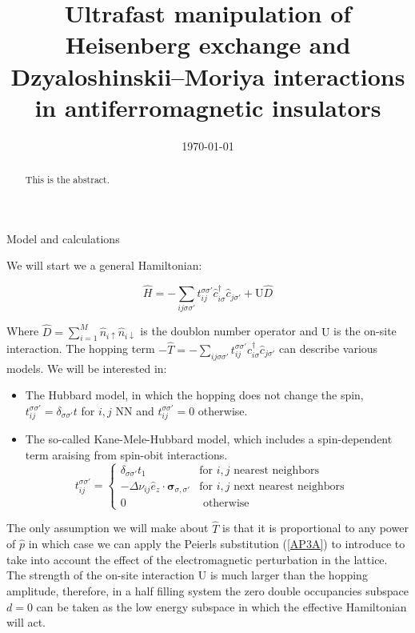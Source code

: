 \documentclass[aps,prl,twocolumn,amsmath,amssymb,superscriptaddress]{revtex4}%
\newcommand{\n}{\nonumber}
\newcommand{\bs}{\boldsymbol}
\begin{document}
\title{Ultrafast manipulation of Heisenberg exchange and Dzyaloshinskii–Moriya interactions in antiferromagnetic insulators}


\begin{abstract}
This is the abstract.
\end{abstract}

\date{\today}
\maketitle

\begin{section}{Model and calculations}

We will start we a general Hamiltonian:

\begin{equation}
\hat{H} = -\sum_{ij\sigma \sigma'} t_{ij}^{\sigma \sigma'} \hat{c}_{i \sigma}^\dagger \hat{c}_{j \sigma'} + \text{U}\hat{D}
\end{equation}

Where $\hat{D} = \sum_{i=1}^M \hat{n}_{i\uparrow}\hat{n}_{i\downarrow}$ is the doublon number operator and $\text{U}$ is the on-site interaction. The hopping term $-\hat{T} = -\sum_{ij\sigma \sigma'} t_{ij}^{\sigma \sigma'} \hat{c}_{i \sigma}^\dagger \hat{c}_{j \sigma'}$ can describe various models. We will be interested in:

\begin{itemize}
	\item The Hubbard model, in which the hopping does not change the spin, $t_{ij}^{\sigma \sigma'} = \delta_{\sigma \sigma'}t$ for $i,j$ NN and $t_{ij}^{\sigma \sigma'} = 0$ otherwise.
	\item The so-called Kane-Mele-Hubbard model, which includes a spin-dependent term araising from spin-obit interactions.
	\begin{equation}
t_{ij}^{\sigma \sigma'} = \begin{cases}
	\delta_{\sigma \sigma'}t_1 & \text{for } i, j \text{ nearest neighbors} \\
	-\Delta \nu_{ij} \hat{e}_z \cdot \bs{\sigma}_{\sigma, \sigma'} & \text{for } i, j \text{ next nearest neighbors} \\
	0 & \text{ otherwise} \n
\end{cases} \quad
\end{equation}
\end{itemize}

The only assumption we will make about $\hat{T}$ is that it is proportional to any power of $\hat{p}$ in which case we can apply the Peierls substitution (\ref{AP3A}) to introduce to take into account the effect of the electromagnetic perturbation in the lattice. The strength of the on-site interaction $\text{U}$ is much larger than the hopping amplitude, therefore, in a half filling system the zero double occupancies subspace $d=0$ can be taken as the low energy subspace in which the effective Hamiltonian will act.


\end{section}
\end{document}

